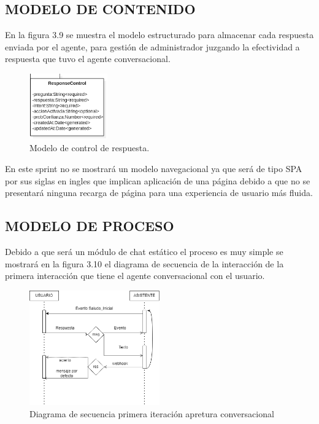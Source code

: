 \documentclass[letter, openright, 12pt]{book}
\begin{document}
\subsection{MODELO DE CONTENIDO}
En la figura 3.9 se muestra el modelo estructurado para almacenar cada respuesta enviada por el agente, para gestión de administrador juzgando la efectividad a respuesta que tuvo el agente conversacional. 

\begin{figure}[H]
\centering
\includegraphics[width=0.3\textwidth]{figura3_9}
 \caption{Modelo de control de respuesta.}
\label{fig:figura3_9}
\end{figure}

\par En este sprint no se mostrará un modelo navegacional ya que será de tipo SPA por sus siglas en ingles que implican aplicación de una página debido a que no se presentará ninguna recarga de página para una experiencia de usuario más fluida. 

\subsection{MODELO DE PROCESO}

Debido a que será un módulo de chat estático el proceso es muy simple se mostrará en la figura 3.10 el diagrama de secuencia de la interacción de la primera interacción que tiene el agente conversacional con el usuario. 

\begin{figure}[H]
\centering
\includegraphics[width=0.5\textwidth]{figura3_10}
 \caption{Diagrama de secuencia primera iteración apretura conversacional}
\label{fig:figura3_10}
\end{figure}
\end{document}
